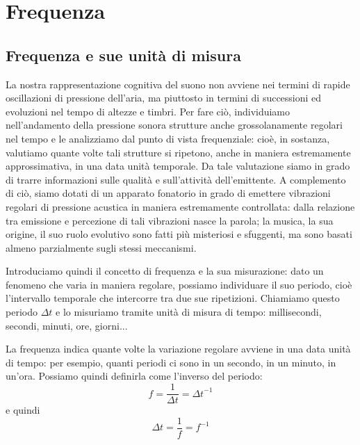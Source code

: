 
\chapter{Frequenza}


\section{Frequenza e sue unità di misura}

La nostra rappresentazione cognitiva del suono non avviene nei termini di rapide oscillazioni di pressione dell'aria, ma piuttosto in termini di successioni ed evoluzioni nel tempo di altezze e timbri. Per fare ciò, individuiamo nell'andamento della pressione sonora strutture anche grossolanamente regolari nel tempo e le analizziamo dal punto di vista frequenziale: cioè, in sostanza, valutiamo quante volte tali strutture si ripetono, anche in maniera estremamente approssimativa, in una data unità temporale. Da tale valutazione siamo in grado di trarre informazioni sulle qualità e sull'attività dell'emittente. A complemento di ciò, siamo dotati di un apparato fonatorio in grado di emettere vibrazioni regolari di pressione acustica in maniera estremamente controllata: dalla relazione tra emissione e percezione di tali vibrazioni nasce la parola; la musica, la sua origine, il suo ruolo evolutivo sono fatti più misteriosi e sfuggenti, ma sono basati almeno parzialmente sugli stessi meccanismi.

Introduciamo quindi il concetto di frequenza e la sua misurazione: dato un fenomeno che varia in maniera regolare, possiamo individuare il suo periodo, cioè l'intervallo temporale che intercorre tra due sue ripetizioni. Chiamiamo questo periodo $\Delta t$ e lo misuriamo tramite unità di misura di tempo: millisecondi, secondi, minuti, ore, giorni...

La frequenza indica quante volte la variazione regolare avviene in una data unità di tempo: per esempio, quanti periodi ci sono in un secondo, in un minuto, in un'ora. Possiamo quindi definirla come l'inverso del periodo:
\begin{equation}
f = \frac{1}{\Delta t} = {\Delta t}^{-1}
\end{equation}
e quindi
\begin{equation}
{\Delta t} = \frac{1}{f} = f^{-1}
\end{equation}

